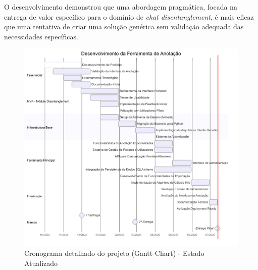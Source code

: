O desenvolvimento demonstrou que uma abordagem pragmática, focada na entrega de valor específico para o domínio de \textit{chat disentanglement}, é mais eficaz que uma tentativa de criar uma solução genérica sem validação adequada das necessidades específicas.

\begin{landscape}
    \begin{figure}[p]
        \centering
        \includegraphics[width=0.9\linewidth, height=0.85\textheight, keepaspectratio]{images/3-cronograma-detalhado-do-projeto-gantt-chart.png}
        \caption{Cronograma detalhado do projeto (Gantt Chart) - Estado Atualizado}
        \label{fig:gantt-chart}
    \end{figure}
\end{landscape}
